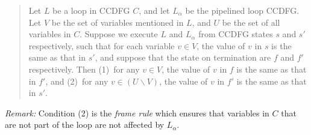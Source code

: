 \begin{quote}
Let $L$ be a loop in CCDFG $C$, and let $L_{\alpha}$ be the
pipelined loop CCDFG. Let $V$ be the set of
variables mentioned in $L$, and $U$ be the set of all
variables in $C$.  Suppose we execute $L$ and $L_{\alpha}$
from CCDFG states $s$ and $s'$ respectively, such that for
each variable $v\in V$, the value of $v$ in $s$ is the same
as that in $s'$, and suppose that the state on termination
are $f$ and $f'$ respectively.  Then (1)~for any $v\in V$,
the value of $v$ in $f$ is the same as that in $f'$, and
(2)~for any $v\in(U\backslash V)$, the value of $v$ in $f'$
is the same as that in $s'$.
\end{quote}
\noindent
{\em Remark:} Condition (2) is the {\em frame rule} which
ensures that variables in $C$ that are not part of the loop
are not affected by $L_{\alpha}$.

